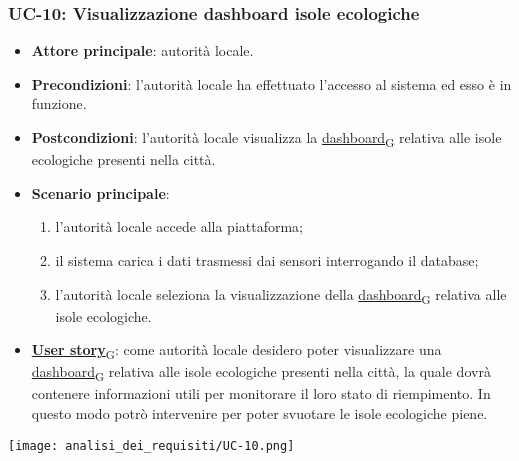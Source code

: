 \subsubsection{UC-10: Visualizzazione dashboard isole ecologiche}
\begin{itemize}
	\item \textbf{Attore principale}: autorità locale.
	\item \textbf{Precondizioni}: l'autorità locale ha effettuato l'accesso al sistema ed esso è in funzione.
	\item \textbf{Postcondizioni}: l'autorità locale visualizza la \href{https://7last.github.io/docs/pb/documentazione-interna/glossario\#dashboard}{dashboard\textsubscript{G}} relativa
	      alle isole ecologiche presenti nella città.
	\item \textbf{Scenario principale}:
	      \begin{enumerate}
		      \item l'autorità locale accede alla piattaforma;
		      \item il sistema carica i dati trasmessi dai sensori interrogando il database;
		      \item l'autorità locale seleziona la visualizzazione della \href{https://7last.github.io/docs/pb/documentazione-interna/glossario\#dashboard}{dashboard\textsubscript{G}} relativa alle isole ecologiche.
	      \end{enumerate}
	\item \href{https://7last.github.io/docs/pb/documentazione-interna/glossario\#user-story}{\textbf{User story}\textsubscript{G}}:
	      come autorità locale desidero poter visualizzare una \href{https://7last.github.io/docs/pb/documentazione-interna/glossario\#dashboard}{dashboard\textsubscript{G}} relativa alle isole ecologiche presenti nella città, la quale
	      dovrà contenere informazioni utili per monitorare il loro stato di riempimento. In questo modo potrò intervenire
	      per poter svuotare le isole ecologiche piene.
\end{itemize}
\begin{center}
	\texttt{[image: analisi\_dei\_requisiti/UC-10.png]}
\end{center}


